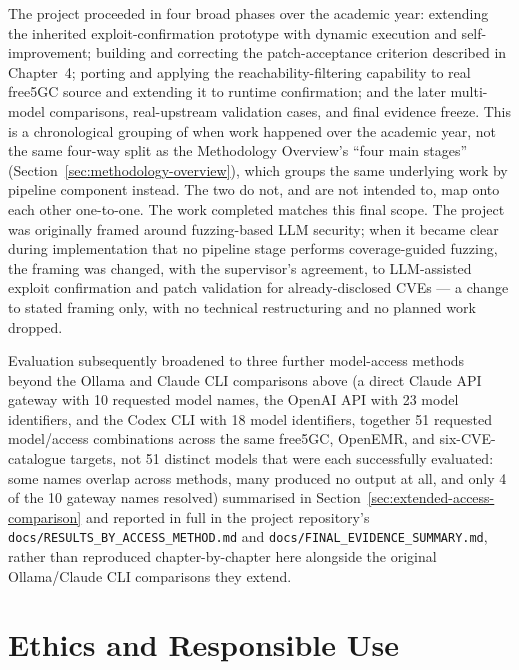 \documentclass[12pt,a4paper]{report}
\begin{document}
The project proceeded in four broad phases over the academic year: extending the inherited exploit-confirmation prototype with dynamic execution and self-improvement; building and correcting the patch-acceptance criterion described in Chapter~4; porting and applying the reachability-filtering capability to real free5GC source and extending it to runtime confirmation; and the later multi-model comparisons, real-upstream validation cases, and final evidence freeze. This is a chronological grouping of when work happened over the academic year, not the same four-way split as the Methodology Overview's ``four main stages'' (Section~\ref{sec:methodology-overview}), which groups the same underlying work by pipeline component instead. The two do not, and are not intended to, map onto each other one-to-one. The work completed matches this final scope. The project was originally framed around fuzzing-based LLM security; when it became clear during implementation that no pipeline stage performs coverage-guided fuzzing, the framing was changed, with the supervisor's agreement, to LLM-assisted exploit confirmation and patch validation for already-disclosed CVEs — a change to stated framing only, with no technical restructuring and no planned work dropped.

Evaluation subsequently broadened to three further model-access methods beyond the Ollama and Claude CLI comparisons above (a direct Claude API gateway with 10 requested model names, the OpenAI API with 23 model identifiers, and the Codex CLI with 18 model identifiers, together 51 requested model/access combinations across the same free5GC, OpenEMR, and six-CVE-catalogue targets, not 51 distinct models that were each successfully evaluated: some names overlap across methods, many produced no output at all, and only 4 of the 10 gateway names resolved) summarised in Section~\ref{sec:extended-access-comparison} and reported in full in the project repository's \texttt{docs/RESULTS\_BY\_ACCESS\_METHOD.md} and \texttt{docs/FINAL\_EVIDENCE\_SUMMARY.md}, rather than reproduced chapter-by-chapter here alongside the original Ollama/Claude CLI comparisons they extend.

\section{Ethics and Responsible Use}
\label{sec:ethics}
\end{document}
